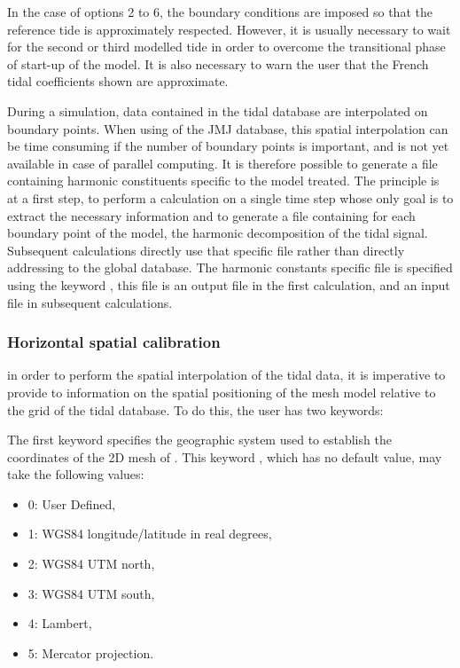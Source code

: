 In the case of options 2 to 6, the boundary conditions are imposed so that the
reference tide is approximately respected. However, it is usually necessary to
wait for the second or third modelled tide in order to overcome the
transitional phase of start-up of the model. It is also necessary to warn the
user that the French tidal coefficients shown are approximate.

During a simulation, data contained in the tidal database are interpolated on
boundary points. When using of the JMJ database, this spatial interpolation can
be time consuming if the number of boundary points is important, and is not yet
available in case of parallel computing. It is therefore possible to generate a
file containing harmonic constituents specific to the model treated. The
principle is at a first step, to perform a calculation on a single time step
whose only goal is to extract the necessary information and to generate a file
containing for each boundary point of the model, the harmonic decomposition of
the tidal signal. Subsequent calculations directly use that specific file
rather than directly addressing to the global database. The harmonic constants
specific file is specified using the keyword ,
this file is an output file in the first calculation, and an input file in
subsequent calculations.


\subsubsection{Horizontal spatial calibration}

in order to perform the spatial interpolation of the tidal data, it is
imperative to provide to  information on the spatial positioning of
the mesh model relative to the grid of the tidal database. To do this, the user
has two keywords:

The first keyword specifies the geographic system used to establish the
coordinates of the 2D mesh of . This keyword , which has no default value, may take the following values:

\begin{itemize}
\item 0: User Defined,

\item 1: WGS84 longitude/latitude in real degrees,

\item 2: WGS84 UTM north,

\item 3: WGS84 UTM south,

\item 4: Lambert,

\item 5: Mercator projection.
\end{itemize}


